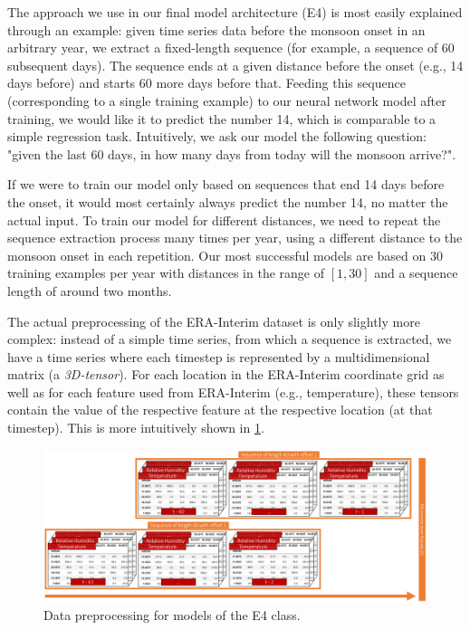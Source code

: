 The approach we use in our final model architecture (E4) is most easily explained through an example: given time series data before the monsoon onset in an arbitrary year, we extract a fixed-length sequence (for example, a sequence of 60 subsequent days). The sequence ends at a given distance before the onset (e.g., 14 days before) and starts 60 more days before that. Feeding this sequence (corresponding to a single training example) to our neural network model after training, we would like it to predict the number 14, which is comparable to a simple regression task. Intuitively, we ask our model the following question: "given the last 60 days, in how many days from today will the monsoon arrive?".

If we were to train our model only based on sequences that end 14 days before the onset, it would most certainly always predict the number 14, no matter the actual input. To train our model for different distances, we need to repeat the sequence extraction process many times per year, using a different distance to the monsoon onset in each repetition. Our most successful models are based on 30 training examples per year with distances in the range of $[1, 30]$ and a sequence length of around two months.

The actual preprocessing of the ERA-Interim dataset is only slightly more complex: instead of a simple time series, from which a sequence is extracted, we have a time series where each timestep is represented by a multidimensional matrix (a \textit{3D-tensor}). For each location in the ERA-Interim coordinate grid as well as for each feature used from ERA-Interim (e.g., temperature), these tensors contain the value of the respective feature at the respective location (at that timestep). This is more intuitively shown in \cref{fig:e4_preprocessing}.

\begin{figure}[h]
  \centering
  \includegraphics[width=\linewidth]{./99_appendix/img/E4_preprocessing}
  \caption{Data preprocessing for models of the E4 class.}
  \label{fig:e4_preprocessing}
\end{figure}

